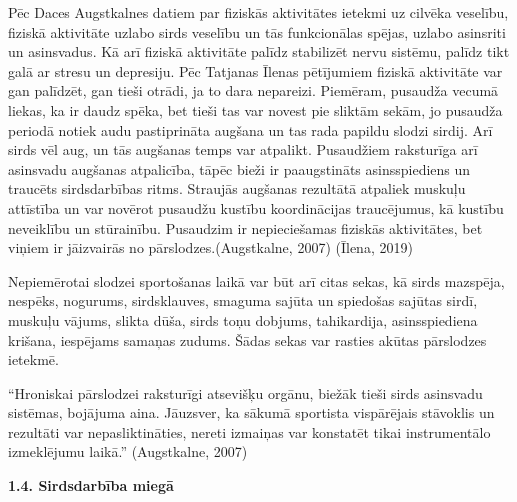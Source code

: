\documentclass[12pt]{article}
\begin{document}
Pēc Daces Augstkalnes datiem par fiziskās aktivitātes ietekmi uz cilvēka veselību, fiziskā aktivitāte uzlabo sirds veselību un tās funkcionālas spējas, uzlabo asinsriti un asinsvadus. Kā arī fiziskā aktivitāte palīdz stabilizēt nervu sistēmu, palīdz tikt galā ar stresu un depresiju. Pēc Tatjanas Īlenas pētījumiem fiziskā aktivitāte var gan palīdzēt, gan tieši otrādi, ja to dara nepareizi. Piemēram, pusaudža vecumā liekas, ka ir daudz spēka, bet tieši tas var novest pie sliktām sekām, jo pusaudža periodā notiek audu pastiprināta augšana un tas rada papildu slodzi sirdij. Arī sirds vēl aug, un tās augšanas temps var atpalikt. Pusaudžiem raksturīga arī asinsvadu augšanas atpalicība, tāpēc bieži ir paaugstināts asinsspiediens un traucēts sirdsdarbības ritms. Straujās augšanas rezultātā atpaliek muskuļu attīstība un var novērot pusaudžu kustību koordinācijas traucējumus, kā kustību neveiklību un stūrainību. Pusaudzim ir nepieciešamas fiziskās aktivitātes, bet viņiem ir jāizvairās no pārslodzes.(Augstkalne, 2007) (Īlena, 2019)\par
Nepiemērotai slodzei sportošanas laikā var būt arī citas sekas, kā sirds mazspēja, nespēks, nogurums, sirdsklauves, smaguma sajūta un spiedošas sajūtas sirdī, muskuļu vājums, slikta dūša, sirds toņu dobjums, tahikardija, asinsspiediena krišana, iespējams samaņas zudums. Šādas sekas var rasties akūtas pārslodzes ietekmē.\par
“Hroniskai pārslodzei raksturīgi atsevišķu orgānu, biežāk tieši sirds asinsvadu sistēmas, bojājuma aina. Jāuzsver, ka sākumā sportista vispārējais stāvoklis un rezultāti var nepasliktināties, nereti izmaiņas var konstatēt tikai instrumentālo izmeklējumu laikā.” 
(Augstkalne, 2007)

\begin{center}
\fontsize{14}{}\selectfont\textbf{1.4. Sirdsdarbība miegā}
\end{center}
\end{document}
